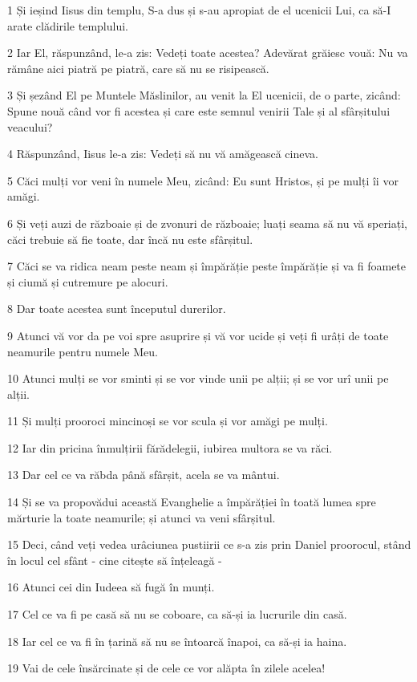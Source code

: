 \par 1 Și ieșind Iisus din templu, S-a dus și s-au apropiat de el ucenicii Lui, ca să-I arate clădirile templului.
\par 2 Iar El, răspunzând, le-a zis: Vedeți toate acestea? Adevărat grăiesc vouă: Nu va rămâne aici piatră pe piatră, care să nu se risipească.
\par 3 Și șezând El pe Muntele Măslinilor, au venit la El ucenicii, de o parte, zicând: Spune nouă când vor fi acestea și care este semnul venirii Tale și al sfârșitului veacului?
\par 4 Răspunzând, Iisus le-a zis: Vedeți să nu vă amăgească cineva.
\par 5 Căci mulți vor veni în numele Meu, zicând: Eu sunt Hristos, și pe mulți îi vor amăgi.
\par 6 Și veți auzi de războaie și de zvonuri de războaie; luați seama să nu vă speriați, căci trebuie să fie toate, dar încă nu este sfârșitul.
\par 7 Căci se va ridica neam peste neam și împărăție peste împărăție și va fi foamete și ciumă și cutremure pe alocuri.
\par 8 Dar toate acestea sunt începutul durerilor.
\par 9 Atunci vă vor da pe voi spre asuprire și vă vor ucide și veți fi urâți de toate neamurile pentru numele Meu.
\par 10 Atunci mulți se vor sminti și se vor vinde unii pe alții; și se vor urî unii pe alții.
\par 11 Și mulți prooroci mincinoși se vor scula și vor amăgi pe mulți.
\par 12 Iar din pricina înmulțirii fărădelegii, iubirea multora se va răci.
\par 13 Dar cel ce va răbda până sfârșit, acela se va mântui.
\par 14 Și se va propovădui această Evanghelie a împărăției în toată lumea spre mărturie la toate neamurile; și atunci va veni sfârșitul.
\par 15 Deci, când veți vedea urâciunea pustiirii ce s-a zis prin Daniel proorocul, stând în locul cel sfânt - cine citește să înțeleagă -
\par 16 Atunci cei din Iudeea să fugă în munți.
\par 17 Cel ce va fi pe casă să nu se coboare, ca să-și ia lucrurile din casă.
\par 18 Iar cel ce va fi în țarină să nu se întoarcă înapoi, ca să-și ia haina.
\par 19 Vai de cele însărcinate și de cele ce vor alăpta în zilele acelea!
